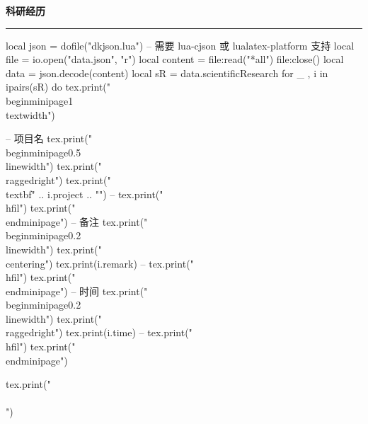 \documentclass[10pt, a4paper, oneside]{ctexart}
\begin{document}
\ifdefined\scientificResearch
\begin{minipage}{1\textwidth}
    \large{\ifdefined\showIcon \makebox[\iconAlignWide][c]{\faFlask} \if\textbf{科研经历}}
\end{minipage}
\rule{\linewidth}{\lineSize}
\begin{center}
    \begin{minipage}{0.9\textwidth}
        \begin{luacode}
            local json = dofile("dkjson.lua")  -- 需要 lua-cjson 或 lualatex-platform 支持
            local file = io.open("data.json", "r")
            local content = file:read("*all")
            file:close()
            local data = json.decode(content)
            local sR = data.scientificResearch
            for _ , i in ipairs(sR) do
                tex.print("\\begin{minipage}{1\\textwidth}")

                -- 项目名
                tex.print("\\begin{minipage}{0.5\\linewidth}")
                tex.print("\\raggedright")
                tex.print("\\textbf{" .. i.project .. "}")
                -- tex.print("\\hfil")
                tex.print("\\end{minipage}")
                -- 备注
                tex.print("\\begin{minipage}{0.2\\linewidth}")
                tex.print("\\centering")
                tex.print(i.remark)
                -- tex.print("\\hfil")
                tex.print("\\end{minipage}")
                -- 时间
                tex.print("\\begin{minipage}{0.2\\linewidth}")
                tex.print("\\raggedright")
                tex.print(i.time)
                -- tex.print("\\hfil")
                tex.print("\\end{minipage}")

                tex.print("\\\\[0.8em]")


\end{luacode}
\end{minipage}
\end{center}
\end{document}
